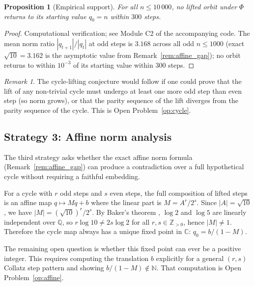 \documentclass[12pt,reqno]{amsart}
\theoremstyle{plain}
\newtheorem{proposition}[theorem]{Proposition}
\theoremstyle{definition}
\theoremstyle{remark}
\newtheorem{remark}[theorem]{Remark}
\newcommand{\CC}{\mathbb{C}}
\newcommand{\ZZ}{\mathbb{Z}}
\newcommand{\NN}{\mathbb{N}}
\newcommand{\abs}[1]{\left|#1\right|}
\newcommand{\QQ}{\mathbb{Q}}   %
\begin{document}
\begin{proposition}[Empirical support]
\label{prop:cycle_empirical}
For all $n \leq 10\,000$, no lifted orbit under $\Phi$ returns to its
starting value $q_0 = n$ within $300$ steps.
\end{proposition}

\begin{proof}
Computational verification; see Module C2 of the accompanying code.
The mean norm ratio $\abs{q_{t+1}}/\abs{q_t}$ at odd steps is $3.168$
across all odd $n \leq 1000$ (exact $\sqrt{10} = 3.162$ is the
asymptotic value from Remark~\ref{rem:affine_gap}); no orbit returns
to within $10^{-3}$ of its starting value within $300$ steps.
\end{proof}

\begin{remark}
The cycle-lifting conjecture would follow if one could prove that the
lift of any non-trivial cycle must undergo at least one more odd step
than even step (so norm grows), or that the parity sequence of the
lift diverges from the parity sequence of the cycle.  This is Open
Problem~\ref{op:cycle}.
\end{remark}

\subsection{Strategy 3: Affine norm analysis}
\label{sec:coupled}

The third strategy asks whether the exact affine norm formula
(Remark~\ref{rem:affine_gap}) can produce a contradiction over a full
hypothetical cycle without requiring a faithful embedding.

For a cycle with $r$ odd steps and $s$ even steps, the full composition
of lifted steps is an affine map $q \mapsto Mq + b$ where the linear
part is $M = A^r/2^s$.  Since $\abs{A} = \sqrt{10}$, we have
$\abs{M} = (\sqrt{10})^r / 2^s$.  By Baker's theorem \cite{Baker1975},
$\log 2$ and $\log 5$ are linearly independent over $\QQ$, so
$r\log 10 \neq 2s\log 2$ for all $r,s \in \ZZ_{>0}$, hence
$\abs{M} \neq 1$.  Therefore the cycle map always has a unique fixed
point in $\CC$: $q_0 = b/(1-M)$.

The remaining open question is whether this fixed point can ever be a
positive integer.  This requires computing the translation $b$
explicitly for a general $(r,s)$ Collatz step pattern and showing
$b/(1-M) \notin \NN$.  That computation is Open Problem~\ref{op:affine}.
\end{document}
